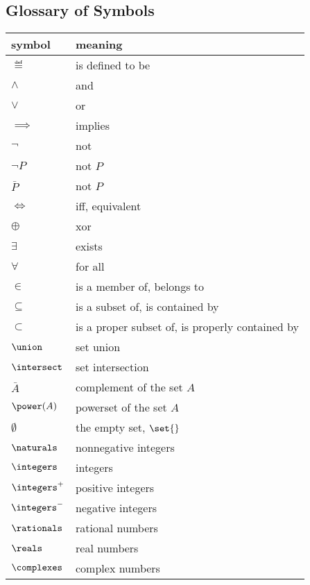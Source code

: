 \subsection{Glossary of Symbols}
\begin{center}
\begin{tabular}{ll}
symbol &  meaning\\
\hline
$\eqdef$ & is defined to be\\
$\land$ & and\\
$\lor$ & or\\
$\implies$ & implies\\
$\neg$    & not\\
$\neg{P}$ & not $P$\\
$\bar{P}$ & not $P$\\
$\iff$    & iff, equivalent\\
$\oplus$   & xor\\
$\exists$ & exists\\
$\forall$ & for all\\
$\in$   &  is a member of, belongs to\\
$\subseteq$ & is a subset of, is contained by\\
$\subset$ & is a proper subset of, is properly contained by\\
$\union$  & set union\\
$\intersect$ & set intersection\\
$\bar{A}$ & complement of the set $A$\\
$\power(A)$ & powerset of the set $A$\\
$\emptyset$ & the empty set, $\set{}$\\
$\naturals$ & nonnegative integers \\
$\integers$ & integers\\
$\integers^+$ & positive integers\\
$\integers^-$ & negative integers\\
$\rationals$ & rational numbers\\
$\reals$ & real numbers\\
$\complexes$ & complex numbers\\
\end{tabular}
\end{center}

\begin{problems}
\homeworkproblems
{}

\end{problems}

